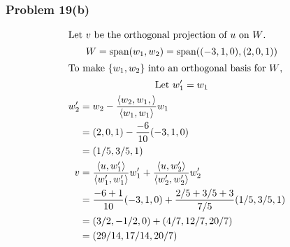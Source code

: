 \documentclass[12pt]{article}
\begin{document}
\subsubsection*{Problem 19(b)} 
\begin{gather*} 
	\intertext{Let $v$ be the orthogonal projection of $u$ on $W$.}
	W = \text{span}(w_1, w_2) = \text{span}((-3,1,0), (2,0,1)) \\
	\intertext{To make $\{w_1, w_2\}$ into an orthogonal basis for $W$,}
	\text{Let } w_1' = w_1 \\
	\begin{align*} 
		w_2' &= w_2 - \frac{\langle w_2,w_1, \rangle}{\langle w_1, w_1 \rangle} w_1 &\\
		&= (2,0,1) - \frac{-6}{10} (-3,1,0) \\
		&= (1/5,3/5,1) \\
		v &= \frac{\langle u, w_1' \rangle}{\langle w_1', w_1' \rangle}w_1' +
			\frac{\langle u, w_2' \rangle}{\langle w_2', w_2' \rangle}w_2' \\
		&= \frac{-6 + 1}{10}(-3,1,0) + \frac{2/5 + 3/5 + 3}{7/5}(1/5,3/5,1) \\
		&= (3/2,-1/2,0) + (4/7,12/7,20/7) \\
		&= (29/14,17/14,20/7)
	\end{align*} 
\end{gather*} 
\filbreak
\end{document}
